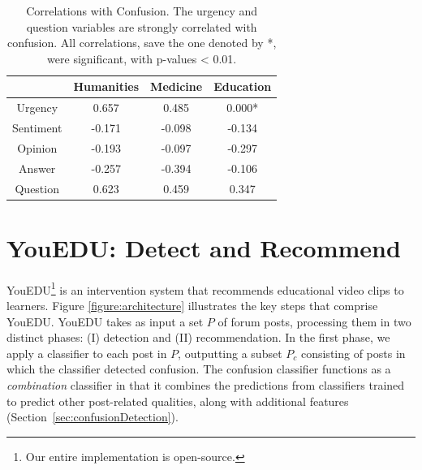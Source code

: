 \documentclass{edm_template}
\begin{document}
\begin{table}
       \centering
       \begin{tabular}{|c|c|c|c|}
       \hline
          & Humanities & Medicine & Education \\ \hline
        Urgency   & 0.657                & 0.485              & 0.000* \\ \hline
        Sentiment & -0.171                & -0.098             & -0.134 \\ \hline
        Opinion   & -0.193                & -0.097             & -0.297 \\ \hline
        Answer    & -0.257                & -0.394             & -0.106  \\ \hline
        Question  & 0.623                & 0.459              & 0.347  \\ \hline
       \end{tabular}
       \vspace{-5pt}
       \caption{\textnormal{
       Correlations with Confusion. The urgency and question variables are strongly correlated with confusion. All correlations, save the one denoted by *, were significant, with p-values < 0.01.
       }} 
       \label{table:correlations} %
\end{table}


\section{YouEDU: Detect and Recommend}
\label{sec:arch}

YouEDU\footnote{Our entire implementation is open-source.} is an intervention system that recommends educational video clips to learners. Figure \ref{figure:architecture} illustrates the key steps that comprise YouEDU. YouEDU takes as input a set $P$ of forum posts, processing them in two distinct phases: (I) detection and (II) recommendation. In the first phase, we apply a classifier to each post in $P$, outputting a subset $P_{c}$ consisting of posts in which the classifier detected confusion. The confusion classifier functions as a \emph{combination} classifier in that it combines the predictions from classifiers trained to predict other post-related qualities, along with additional features (Section~\ref{sec:confusionDetection}).
\end{document}
